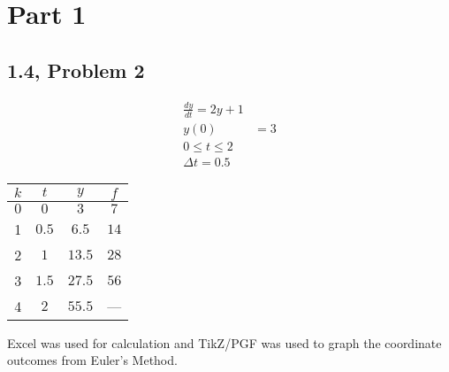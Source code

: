 \documentclass[12pt]{mypackage}
\begin{document}
\RaggedRight
\section{Part 1}%
\subsection{1.4, Problem 2}%
\begin{align*}
  \frac{dy}{dt} = 2y + 1\\
  y(0) &= 3\\
  0 \leq t \leq 2\\
  \Delta t = 0.5
\end{align*}
\begin{center}
  \begin{tabular}{c|c|c|c}
    $k$ & $t$ & $y$ & $f$\\
    \hline
    $0$ & $0$ & $3$ & $7$\\
    1 & $0.5$ & $6.5$ & $14$\\
    2 & $1$ & $13.5$ & $28$\\
    3 & $1.5$ & $27.5$ & $56$\\
    4 & $2$ & $55.5$ & ---
  \end{tabular}
\end{center}
\begin{center}
\end{center}
Excel was used for calculation and TikZ/PGF was used to graph the coordinate outcomes from Euler's Method.
\end{document}

